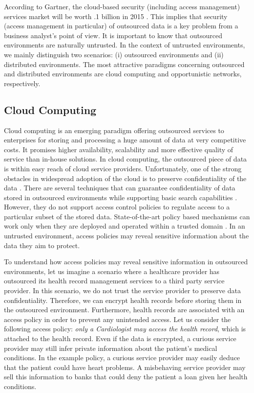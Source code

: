 \documentclass[epsfig,a4paper,11pt,titlepage]{book}
\numberwithin{algorithm}{chapter}
\begin{document}
According to Gartner, the cloud-based security (including access management) services market will be worth \3.1 billion in 2015 \cite{Gartner:2013}. This implies that security (access management in particular) of outsourced data is a key problem from a business analyst's point of view. It is important to know that outsourced environments are naturally untrusted. In the context of untrusted environments, we mainly distinguish two scenarios: (i) outsourced environments and (ii) distributed environments. The most attractive paradigms concerning outsourced and distributed environments are cloud computing and opportunistic networks, respectively.

\subsection{Cloud Computing}
Cloud computing is an emerging paradigm offering outsourced services to enterprises for storing and processing a huge amount of data at very competitive costs. It promises higher availability, scalability and more effective quality of service than in-house solutions. In cloud computing, the outsourced piece of data is within easy reach of cloud service providers. Unfortunately, one of the strong obstacles in widespread adoption of the cloud is to preserve confidentiality of the data \cite{Armbrust:2010}. There are several techniques that can guarantee confidentiality of data stored in outsourced environments while supporting basic search capabilities \cite{Hore:2012, Kamara:2012, Bosch:2011, Cao:2011, Li:2011, Yang:2011, Zhu:2011, Li:2010, Wang:2010, Yang:2009}. However, they do not support access control policies to regulate access to a particular subset of the stored data. State-of-the-art policy based mechanisms can work only when they are deployed and operated within a trusted domain \cite{Sandhu:1996}. In an untrusted environment, access policies may reveal sensitive information about the data they aim to protect.

To understand how access policies may reveal sensitive information in outsourced environments, let us imagine a scenario where a healthcare provider has outsourced its health record management services to a third party service provider. In this scenario, we do not trust the service provider to preserve data confidentiality. Therefore, we can encrypt health records before storing them in the outsourced environment. Furthermore, health records are associated with an access policy in order to prevent any unintended access. Let us consider the following access policy: \emph{only a Cardiologist may access the health record}, which is attached to the health record. Even if the data is encrypted, a curious service provider may still infer private information about the patient's medical conditions. In the example policy, a curious service provider may easily deduce that the patient could have heart problems. A misbehaving service provider may sell this information to banks that could deny the patient a loan given her health conditions.
\end{document}
